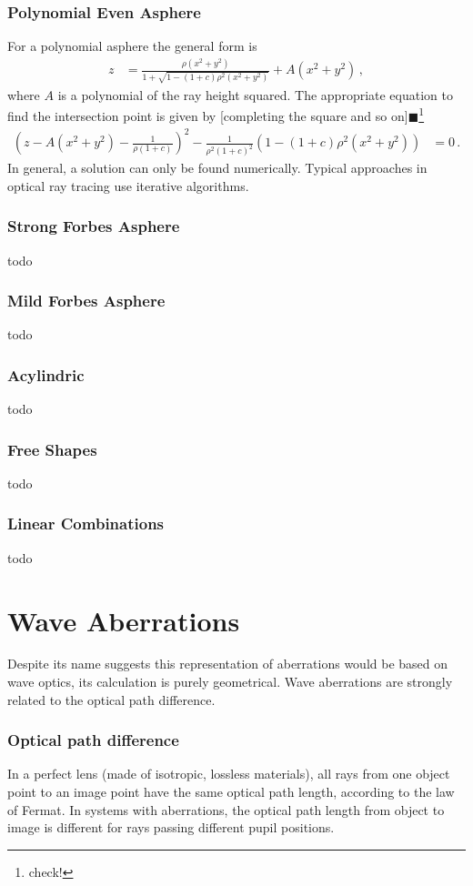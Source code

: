 \documentclass[12pt,a4paper,twoside,openright,BCOR10mm,headsepline,titlepage,abstracton,chapterprefix,final]{scrreprt}
\newcommand{\remark}[1]{{\color{red}$\blacksquare$}\footnote{{\color{red}#1}}}
\begin{document}
\subsection{Polynomial Even Asphere}

For a polynomial asphere the general form is
\begin{align}
  z &=  \frac
 { \rho ( x^2 + y^2 ) }
 { 1 + \sqrt{1 - (1+c) \rho^2  (x^2 + y^2)} } + A(x^2 + y^2)\,,
\end{align}
where $A$ is a polynomial of the ray height squared.
The appropriate equation to find the intersection point is given by [completing the square and so on]\remark{check!}
\begin{align}
 \left(z - A(x^2 + y^2) - \frac{1}{\rho(1+c)}\right)^2 - \frac{1}{\rho^2 (1+c)^2} \left(1 -(1+c)\rho^2 (x^2 + y^2) \right) &= 0\,.
\end{align}
In general, a solution can only be found numerically. 
Typical approaches in optical ray tracing use iterative algorithms.

\subsection{Strong Forbes Asphere}
todo
\subsection{Mild Forbes Asphere}
todo
\subsection{Acylindric}
todo

\subsection{Free Shapes}
todo

\subsection{Linear Combinations}
todo


\chapter{Wave Aberrations}
Despite its name suggests this representation of aberrations would be based on wave optics, its calculation is purely geometrical.
Wave aberrations are strongly related to the optical path difference.

\subsection{Optical path difference}
In a perfect lens (made of isotropic, lossless materials), all rays from one object point to an image point have the same optical path length, according to the law of Fermat. 
In systems with aberrations, the optical path length from object to image is different for rays passing different pupil positions.
\end{document}
